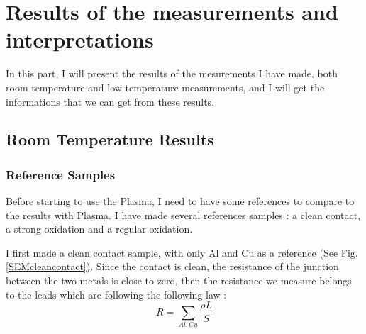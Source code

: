 \chapter{Results of the measurements and interpretations}
\label{Chap4}

In this part, I will present the results of the mesurements I have made, both room temperature and low temperature measurements, and I will get the informations that we can get from these results.

\section{Room Temperature Results}
                \subsection{Reference Samples}
                
                Before starting to use the Plasma, I need to have some references to compare to the results with Plasma. I have made several references samples : a clean contact, a strong oxidation and a regular oxidation.
                
                I first made a clean contact sample, with only Al and Cu as a reference (See Fig.\ref{SEMcleancontact}). Since the contact is clean, the resistance of the junction between the two metals is close to zero, then the resistance we measure belongs to the leads which are following the following law :
                \[R=\sum_{Al,Cu}\dfrac{\rho L}{S}\]
                
